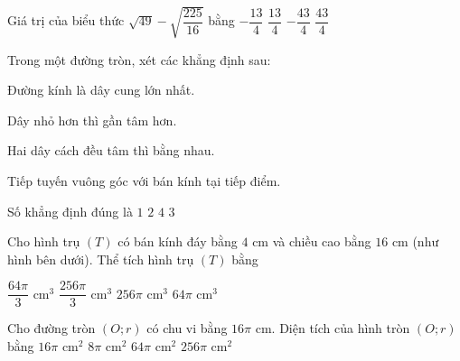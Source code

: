 \begin{ex}%
Giá trị của biểu thức $\sqrt{49}-\sqrt{\dfrac{225}{16}}$ bằng
\choice
{$-\dfrac{13}{4}$}
{\True $\dfrac{13}{4}$}
{$-\dfrac{43}{4}$}
{$\dfrac{43}{4}$}
\end{ex}
\begin{ex}%
Trong một đường tròn, xét các khẳng định sau:
\def\listEXenumi{(\Roman{enumi})}
\begin{listEX}[]
\item Đường kính là dây cung lớn nhất.
\item Dây nhỏ hơn thì gần tâm hơn.
\item Hai dây cách đều tâm thì bằng nhau.
\item Tiếp tuyến vuông góc với bán kính tại tiếp điểm.
\end{listEX}
Số khẳng định đúng là
\choice
{$1$}
{$2$}
{$4$}
{\True $3$}
\end{ex}
\begin{ex}%
Cho hình trụ $(T)$ có bán kính đáy bằng $4$ cm và chiều cao bằng $16$ cm (như hình bên dưới). Thể tích hình trụ $(T)$ bằng
\begin{center}
\end{center}
\choice
{$\dfrac{64\pi}{3}$ cm$^3$}
{$\dfrac{256\pi}{3}$ cm$^3$}
{\True $256\pi$ cm$^3$}
{$64\pi$ cm$^3$}
\end{ex}
\begin{ex}%
Cho đường tròn $(O;r)$ có chu vi bằng $16\pi$ cm. Diện tích của hình tròn $(O;r)$ bằng
\choice
{$16\pi$ cm$^2$}
{$8\pi$ cm$^2$}
{\True $64\pi$ cm$^2$}
{$256\pi$ cm$^2$}
\end{ex}
